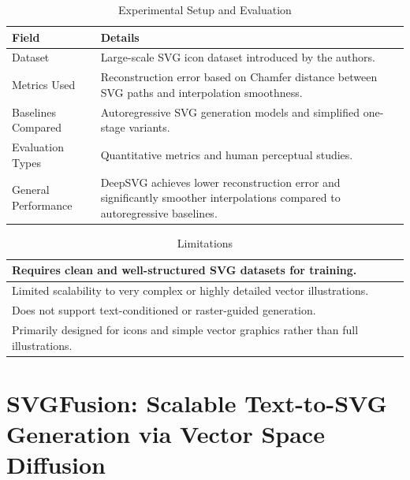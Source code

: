 \begin{table}[h!]
\centering
\caption{Experimental Setup and Evaluation}
\begin{tabular}{|l|p{10cm}|}
\hline
\textbf{Field} & \textbf{Details} \\ \hline

Dataset &
Large-scale SVG icon dataset introduced by the authors. \\ \hline

Metrics Used &
Reconstruction error based on Chamfer distance between SVG paths and interpolation smoothness. \\ \hline

Baselines Compared &
Autoregressive SVG generation models and simplified one-stage variants. \\ \hline

Evaluation Types &
Quantitative metrics and human perceptual studies. \\ \hline

General Performance &
DeepSVG achieves lower reconstruction error and significantly smoother interpolations compared to autoregressive baselines. \\ \hline

\end{tabular}
\end{table}

\begin{table}[h!]
\centering
\caption{Limitations}
\begin{tabular}{|p{14cm}|}
\hline
Requires clean and well-structured SVG datasets for training. \\ \hline
Limited scalability to very complex or highly detailed vector illustrations. \\ \hline
Does not support text-conditioned or raster-guided generation. \\ \hline
Primarily designed for icons and simple vector graphics rather than full illustrations. \\ \hline
\end{tabular}
\end{table}


\newpage
\chapter{SVGFusion: Scalable Text-to-SVG Generation via Vector Space Diffusion}

